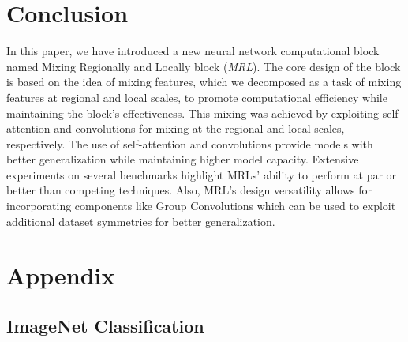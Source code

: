 \documentclass{article}
\begin{document}
\section{Conclusion}

In this paper, we have introduced a new neural network computational block named Mixing Regionally and Locally block (\textit{MRL}). The core design of the block is based on the idea of mixing features, which we decomposed as a task of mixing features at regional and local scales, to promote computational efficiency while maintaining the block's effectiveness. This mixing was achieved by exploiting self-attention and convolutions for mixing at the regional and local scales, respectively. The use of self-attention and convolutions provide models with better generalization while maintaining higher model capacity. Extensive experiments on several benchmarks highlight MRLs' ability to perform at par or better than competing techniques. Also, MRL's design versatility allows for incorporating components like Group Convolutions which can be used to exploit additional dataset symmetries for better generalization. 

























\appendix

\section{Appendix}

\subsection{ImageNet Classification}\label{Appen:IC}
\end{document}
